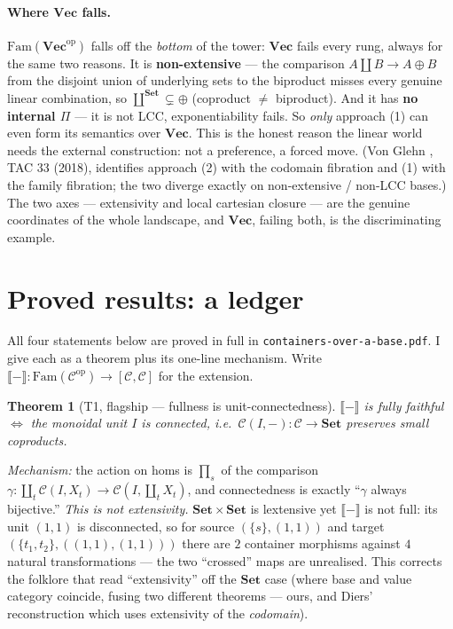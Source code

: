 \documentclass[11pt]{article}
\theoremstyle{plain}
\newtheorem{theorem}{Theorem}
\theoremstyle{definition}
\theoremstyle{remark}
\newcommand{\C}{\mathcal{C}}
\newcommand{\Set}{\mathbf{Set}}
\newcommand{\Vect}{\mathbf{Vec}}
\newcommand{\Fam}{\mathrm{Fam}}
\newcommand{\ext}[1]{\llbracket #1 \rrbracket}
\newcommand{\op}{\mathrm{op}}
\begin{document}
\paragraph{Where $\Vect$ falls.} $\Fam(\Vect^\op)$ falls off the \emph{bottom} of the tower: $\Vect$
fails every rung, always for the same two reasons. It is \textbf{non-extensive} --- the comparison
$A\amalg B\to A\oplus B$ from the disjoint union of underlying sets to the biproduct misses every
genuine linear combination, so $\coprod^{\Set}\subsetneq\oplus$ (coproduct $\neq$ biproduct). And it
has \textbf{no internal $\Pi$} --- it is not LCC, exponentiability fails. So \emph{only} approach (1)
can even form its semantics over $\Vect$. This is the honest reason the linear world needs the external
construction: not a preference, a forced move. (Von Glehn \cite{vonGlehn}, TAC 33 (2018), identifies
approach (2) with the codomain fibration and (1) with the family fibration; the two diverge exactly on
non-extensive / non-LCC bases.) The two axes --- extensivity and local cartesian closure --- are the
genuine coordinates of the whole landscape, and $\Vect$, failing both, is the discriminating example.

\section{Proved results: a ledger}

All four statements below are proved in full in \texttt{containers-over-a-base.pdf}. I give each as a
theorem plus its one-line mechanism. Write $\ext{-}\colon\Fam(\C^\op)\to[\C,\C]$ for the extension.

\begin{theorem}[T1, flagship --- fullness is unit-connectedness]
$\ext{-}$ is \emph{fully faithful} $\iff$ the monoidal unit $I$ is \emph{connected}, i.e.\
$\C(I,-)\colon\C\to\Set$ preserves small coproducts.
\end{theorem}
\noindent\emph{Mechanism:} the action on homs is $\prod_s$ of the comparison $\gamma\colon
\coprod_t\C(I,X_t)\to\C(I,\coprod_t X_t)$, and connectedness is exactly ``$\gamma$ always
bijective.'' \emph{This is not extensivity.} $\Set\times\Set$ is lextensive yet $\ext{-}$ is not full:
its unit $(1,1)$ is disconnected, so for source $(\{s\},(1,1))$ and target $(\{t_1,t_2\},((1,1),(1,1)))$
there are $2$ container morphisms against $4$ natural transformations --- the two ``crossed'' maps are
unrealised. This corrects the folklore that read ``extensivity'' off the $\Set$ case (where base and
value category coincide, fusing two different theorems --- ours, and Diers' reconstruction \cite{Diers}
which uses extensivity of the \emph{codomain}).
\end{document}
